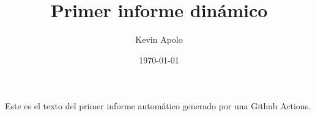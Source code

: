 \documentclass[12pt, a4paper]{book}
\title{Primer informe dinámico}
\author{Kevin Apolo}
\date{\today}
\begin{document}
\maketitle

Este es el texto del primer informe automático generado por una Github Actions.
\end{document}
